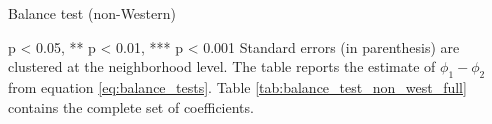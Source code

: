 \documentclass[main.tex]{subfiles}
\begin{document}
\begin{table}[H]
    \centering
    \caption{Balance test (non-Western)}
    \resizebox{\textwidth}{!}{}
    \label{tab:balance_test_non_west}
    \begin{tablenotes}[flushleft]
\item \scriptsize * p < 0.05, ** p < 0.01, *** p < 0.001 Standard errors (in parenthesis) are clustered at the neighborhood level. The table reports the estimate of $\phi_1 - \phi_2$ from equation \ref{eq:balance_tests}. Table \ref{tab:balance_test_non_west_full} contains the complete set of coefficients.
\end{tablenotes}
\end{table}
\end{document}
